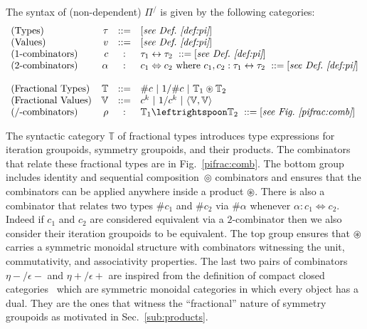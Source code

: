 \documentclass[a4paper,USenglish]{lipics-v2016-utf8x}
\newcommand{\ft}{\mathbb{T}}
\newcommand{\hash}{\#}
\newcommand{\iso}{\leftrightarrow}
\newcommand{\isotwo}{\Leftrightarrow}
\newcommand{\alt}{~|~}
\newcommand{\order}[1]{\hash #1}
\newcommand{\iorder}[1]{1/\hash #1}
\begin{document}
\begin{definition}
\label{def:pifrac}
The syntax of (non-dependent) $\Pi^/$ is given by the following categories:
\[\begin{array}{lrcl}
(\textrm{Types}) & \tau &::=& [\textit{see Def.~\ref{def:pi}}] \\
(\textrm{Values}) & v &::=& [\textit{see Def.~\ref{def:pi}}] \\
(\textrm{1-combinators}) & c &:& \tau_1 \iso \tau_2 ~::= [\textit{see Def.~\ref{def:pi}}] \\
(\textrm{2-combinators}) & \alpha &:& c_1 \isotwo c_2 \mbox{~where~}
  c_1, c_2 : \tau_1 \iso \tau_2 ~::= [\textit{see Def.~\ref{def:pi}}] \\
\\
(\textrm{Fractional Types}) & \mathbb{T} &::=&
  \order{c} \alt \iorder{c} \alt \mathbb{T}_1 \circledast \mathbb{T}_2 \\
 (\textrm{Fractional Values}) & \mathbb{V} &::=&
  c^k \alt 1/c^k \alt \langle \mathbb{V},\mathbb{V} \rangle \\
 (\textrm{/-combinators}) & \rho &:& \mathbb{T}_1 \leftrightspoon \mathbb{T}_2 ~::=
  [\textit{see Fig.~\ref{pifrac:comb}}]
\end{array}\]
\end{definition}

The syntactic category $\ft$ of fractional types introduces type expressions
for iteration groupoids, symmetry groupoids, and their products. The
combinators that relate these fractional types are in Fig.~\ref{pifrac:comb}.
The bottom group includes identity and sequential composition~$\circledcirc$
combinators and ensures that the combinators can be applied anywhere inside a
product $\circledast$. There is also a combinator that relates two types
$\order{c_1}$ and $\order{c_2}$ via $\order{\alpha}$ whenever $\alpha : c_1
\isotwo c_2$.  Indeed if $c_1$ and $c_2$ are considered equivalent via a
$2$-combinator then we also consider their iteration groupoids to be equivalent.
The top group ensures that $\circledast$ carries a symmetric monoidal structure
with combinators witnessing the unit, commutativity, and associativity
properties. The last two pairs of combinators $\eta\!- / \epsilon-$ and
$\eta\!+ / \epsilon+$ are inspired from the definition of compact closed
categories~\cite{ccc} which are symmetric monoidal categories in which every
object has a dual. They are the ones that witness the ``fractional'' nature of
symmetry groupoids as motivated in Sec.~\ref{sub:products}.
\end{document}
